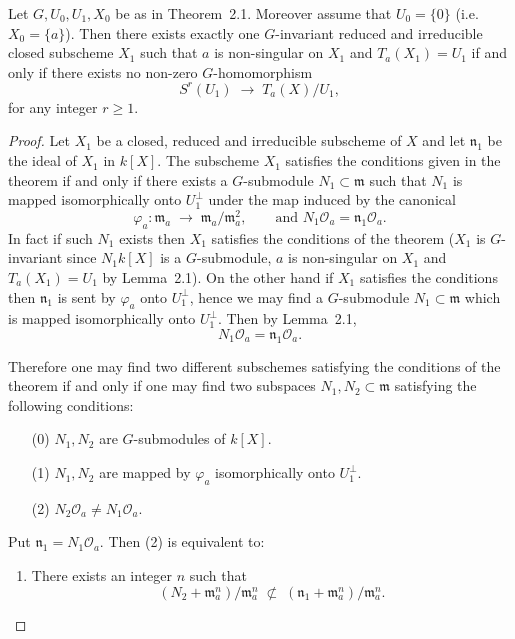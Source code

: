\documentclass[12pt]{article}
\begin{document}
\begin{theorem}[2.2]
Let $G, U_0, U_1, X_0$ be as in Theorem~2.1. Moreover assume that 
$U_0 = \{0\}$ (i.e.\ $X_0 = \{a\}$). Then there exists exactly one 
$G$-invariant reduced and irreducible closed subscheme $X_1$ such that 
$a$ is non-singular on $X_1$ and $T_a(X_1) = U_1$ if and only if there exists 
no non-zero $G$-homomorphism
\[
   S^r(U_1) \;\longrightarrow\; T_a(X)/U_1,
\]
for any integer $r \ge 1$.
\end{theorem}

\begin{proof}
Let $X_1$ be a closed, reduced and irreducible subscheme of $X$ and let 
$\mathfrak n_1$ be the ideal of $X_1$ in $k[X]$. The subscheme $X_1$ satisfies 
the conditions given in the theorem if and only if there exists a 
$G$-submodule $N_1 \subset \mathfrak m$ such that $N_1$ is mapped 
isomorphically onto $U_1^\perp$ under the map induced by the canonical
\[
   \varphi_a : \mathfrak m_a \;\longrightarrow\; \mathfrak m_a / \mathfrak m_a^2,
   \qquad \text{and } N_1 \mathcal O_a = \mathfrak n_1 \mathcal O_a.
\]
In fact if such $N_1$ exists then $X_1$ satisfies the conditions of the theorem 
($X_1$ is $G$-invariant since $N_1 k[X]$ is a $G$-submodule, $a$ is non-singular 
on $X_1$ and $T_a(X_1)=U_1$ by Lemma~2.1). On the other hand if $X_1$ satisfies 
the conditions then $\mathfrak n_1$ is sent by $\varphi_a$ onto $U_1^\perp$, hence 
we may find a $G$-submodule $N_1 \subset \mathfrak m$ which is mapped 
isomorphically onto $U_1^\perp$. Then by Lemma~2.1,
\[
   N_1 \mathcal O_a = \mathfrak n_1 \mathcal O_a.
\]

Therefore one may find two different subschemes satisfying the conditions of 
the theorem if and only if one may find two subspaces $N_1, N_2 \subset \mathfrak m$ 
satisfying the following conditions:
\begin{enumerate}
   \item[(0)] $N_1, N_2$ are $G$-submodules of $k[X]$.
   \item[(1)] $N_1, N_2$ are mapped by $\varphi_a$ isomorphically onto $U_1^\perp$.
   \item[(2)] $N_2 \mathcal O_a \neq N_1 \mathcal O_a$.
\end{enumerate}
Put $\mathfrak n_1 = N_1 \mathcal O_a$. Then (2) is equivalent to:
\begin{enumerate}[(2$'$)]
   \item There exists an integer $n$ such that
   \[
      (N_2 + \mathfrak m_a^n)/\mathfrak m_a^n \;\not\subset\; 
      (\mathfrak n_1 + \mathfrak m_a^n)/\mathfrak m_a^n.
   \]
\end{enumerate}


\end{proof}
\end{document}
